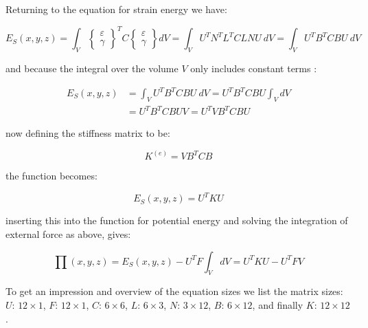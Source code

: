 Returning to the equation for strain energy we have:

\begin{equation}
E_S (x,y,z)
= \int_V
\begin{Bmatrix}
\varepsilon \\
\gamma
\end{Bmatrix}
^T C
\begin{Bmatrix}
\varepsilon \\
\gamma
\end{Bmatrix}
dV = \int_V U^T N^T L^T C L N U \ dV
= \int_V U^T B^T C B U \ dV
\end{equation}

and because the integral over the volume $V$ only includes constant
terms :

\begin{equation}
\begin{aligned}
E_S (x,y,z) 
&= \int_V U^T B^T C B U \ dV 
= U^T B^T C B U \int_V dV \\
&= U^T B^T C B U V 
= U^T V B^T C B U
\end{aligned}
\end{equation}

now defining the stiffness matrix to be:

\begin{equation}
K^{(e)} = V B^T C B
\end{equation}

the function becomes:

\begin{equation}
E_S (x,y,z) = U^T K U
\end{equation}

inserting this into the function for potential energy and solving
the integration of external force as above, gives:

\begin{equation}
\label{eq:linear-sys-eq}
\prod (x,y,z) = E_S(x,y,z) - U^T F \int_V dV = U^T K U - U^T F V
\end{equation}

To get an impression and overview of the equation sizes we list the
matrix sizes: $U$: $12 \times 1$, $F$: $12 \times 1$, $C$: $6 \times
6$, $L$: $6 \times 3$, $N$: $3 \times 12$,
$B$: $6 \times 12$, and finally $K$: $12 \times 12$.


